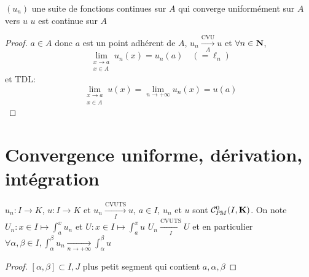 \begin{cor}
    \Hyp $(u_n)$ une suite de fonctions continues sur  $A$ qui converge uniformément sur  $A$ vers  $u$
    \Conc  $u$ est continue sur  $A$
\end{cor}

\begin{proof}
    $a \in  A$ donc $a$ est un point adhérent de  $A$,  $u_n \xrightarrow[A]{\text{CVU}}u$ et $\forall  n \in  \mathbf N$, \[
        \lim_{\substack{x \to  a\\x \in  A}}u_n(x)=u_n(a) \quad (=\ell _n)
    \] 
    et TDL: \[
        \lim_{\substack{x \to  a\\x \in  A}}u(x)=\lim_{n \to  +\infty}u_n(x)=u(a)
    \] 
\end{proof}

\section{Convergence uniforme, dérivation, intégration}

\begin{thm}
    \Hyp $u_n:I\to K$, $u:I\to K$ et $u_n \xrightarrow[I]{\text{CVUTS}}u$, $a \in  I$, $u_n$ et  $u$ sont $\CPM(I, \K)$. On note $U_n:x \in  I \longmapsto \displaystyle\int_a^xu_n$ et $U:x \in  I \longmapsto \displaystyle \int_a^x u$
    \Conc $U_n \xrightarrow[I]{\text{CVUTS}} U$ et en particulier $ \forall \alpha, \beta \in  I, \displaystyle \int_{\alpha}^\beta u_n \xrightarrow[n\to+\infty]{}\int_\alpha^\beta u$
\end{thm}

\begin{proof}
    $[\alpha, \beta] \subset I, J$ plus petit segment qui contient  $a, \alpha, \beta$
\end{proof}
